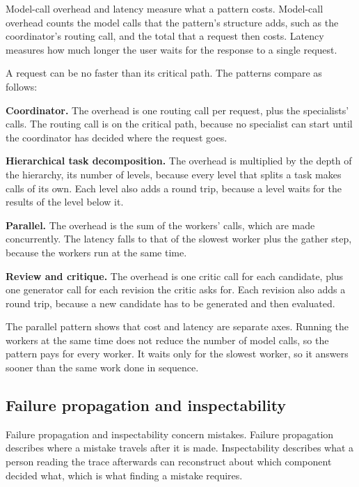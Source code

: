 Model-call overhead and latency measure what a pattern costs. Model-call overhead counts the model
calls that the pattern's structure adds, such as the coordinator's routing call, and the total that
a request then costs. Latency measures how much longer the user waits for the response to a single
request.

A request can be no faster than its critical path. The patterns compare as follows:
\bi
\item \textbf{Coordinator.} The overhead is one routing call per request, plus the specialists'
calls. The routing call is on the critical path, because no specialist can start until the
coordinator has decided where the request goes.
\item \textbf{Hierarchical task decomposition.} The overhead is multiplied by the depth of the
hierarchy, its number of levels, because every level that splits a task makes calls of its own.
Each level also adds a round trip, because a level waits for the results of the level below it.
\item \textbf{Parallel.} The overhead is the sum of the workers' calls, which are made
concurrently. The latency falls to that of the slowest worker plus the gather step, because the
workers run at the same time.
\item \textbf{Review and critique.} The overhead is one critic call for each candidate, plus one
generator call for each revision the critic asks for. Each revision also adds a round trip, because
a new candidate has to be generated and then evaluated.
\ei

The parallel pattern shows that cost and latency are separate axes. Running the workers at the same
time does not reduce the number of model calls, so the pattern pays for every worker. It waits only
for the slowest worker, so it answers sooner than the same work done in sequence.

\subsection{Failure propagation and inspectability}
\label{sec:patterns-failure}

Failure propagation and inspectability concern mistakes. Failure propagation describes where a
mistake travels after it is made. Inspectability describes what a person reading the trace
afterwards can reconstruct about which component decided what, which is what finding a mistake
requires.

